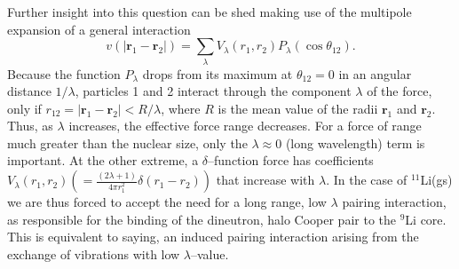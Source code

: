  Further insight into this question can be shed making use of the multipole expansion of a general interaction
\begin{equation*}
v(|\mathbf{r}_1-\mathbf r_2|)=\sum_{\lambda}V_{\lambda}(r_1,r_2)P_\lambda(\cos\theta_{12}).
\end{equation*}
Because the function $P_\lambda$ drops from its maximum at $\theta_{12}=0$ in an angular distance $1/\lambda$, particles 1 and 2 interact through the component $\lambda$ of the force, only if $r_{12}=|\mathbf{r}_1-\mathbf{r}_2|<R/\lambda$, where $R$ is the mean value of the radii $\mathbf{r}_1$ and $\mathbf{r}_2$. Thus, as $\lambda$ increases, the effective force range decreases. For a force of range much greater than the nuclear size, only the $\lambda\approx0$ (long wavelength) term is important. At the other extreme, a $\delta$--function force has coefficients $V_\lambda(r_1,r_2)\left(=\tfrac{(2\lambda+1)}{4\pi r_1^2}\delta(r_1-r_2)\right)$ that increase with $\lambda$. In the case of $^{11}$Li(gs) we are thus forced to accept the need for a long range, low $\lambda$ pairing interaction, as responsible for the binding of the dineutron, halo Cooper pair to the $^9$Li core. This is equivalent to saying, an induced pairing interaction arising from the exchange of vibrations with low $\lambda$--value.
